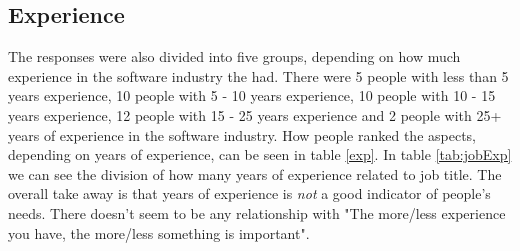 \documentclass{cslthse-msc}
\begin{document}
    \subsection{Experience}
    The responses were also divided into five groups, depending on how much
    experience in the software industry the had. There were 5 people with
    less than 5 years experience, 10 people with 5 - 10 years experience, 10
    people with 10 - 15 years experience, 12 people with 15 - 25 years
    experience and 2 people with 25+ years of experience in the software
    industry. How people ranked the aspects, depending on years of experience, can be seen in table \ref{exp}. In table \ref{tab:jobExp} we can see the division of how many years of experience related to job title.
    The overall take away is that years of experience is \textit{not} a good indicator of people's needs. There doesn't seem to be any relationship with "The more/less experience you have, the more/less something is important".
\end{document}
